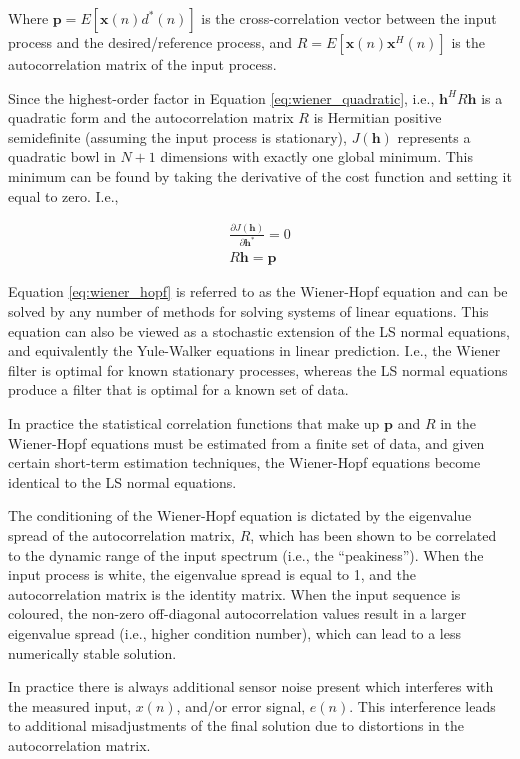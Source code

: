 \noindent
Where $\boldsymbol{p} = E \left[ \boldsymbol{x}(n)d^*(n) \right]$ is the cross-correlation vector between the input process and the desired/reference process, and $R = E \left[ \boldsymbol{x}(n)\boldsymbol{x}^H (n) \right]$ is the autocorrelation matrix of the input process.

Since the highest-order factor in Equation \ref{eq:wiener_quadratic}, i.e., $\boldsymbol{h}^H R \boldsymbol{h}$ is a quadratic form and the autocorrelation matrix $R$ is Hermitian positive semidefinite (assuming the input process is stationary), $J(\boldsymbol{h})$ represents a quadratic bowl in $N+1$ dimensions with exactly one global minimum. This minimum can be found by taking the derivative of the cost function and setting it equal to zero. I.e.,


\begin{eqnarray}
	\frac{\partial J(\boldsymbol{h})}{\partial \boldsymbol{h}^*}=0 \\
	R \boldsymbol{h} = \boldsymbol{p} \label{eq:wiener_hopf}
\end{eqnarray}

Equation \ref{eq:wiener_hopf} is referred to as the Wiener-Hopf equation and can be solved by any number of methods for solving systems of linear equations. This equation can also be viewed as a stochastic extension of the LS normal equations, and equivalently the Yule-Walker equations in linear prediction. I.e., the Wiener filter is optimal for known stationary processes, whereas the LS normal equations produce a filter that is optimal for a known set of data. 

In practice the statistical correlation functions that make up $\boldsymbol{p}$ and $R$ in the Wiener-Hopf equations must be estimated from a finite set of data, and given certain short-term estimation techniques, the Wiener-Hopf equations become identical to the LS normal equations.

The conditioning of the Wiener-Hopf equation is dictated by the eigenvalue spread of the autocorrelation matrix, $R$, which has been shown to be correlated to the dynamic range of the input spectrum (i.e., the “peakiness”). When the input process is white, the eigenvalue spread is equal to 1, and the autocorrelation matrix is the identity matrix. When the input sequence is coloured, the non-zero off-diagonal autocorrelation values result in a larger eigenvalue spread (i.e., higher condition number), which can lead to a less numerically stable solution.

In practice there is always additional sensor noise present which interferes with the measured input, $x(n)$, and/or error signal, $e(n)$. This interference leads to additional misadjustments of the final solution due to distortions in the autocorrelation matrix.

